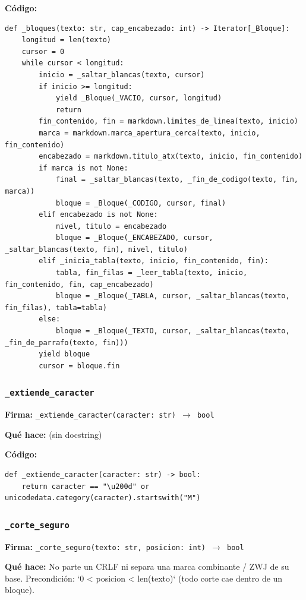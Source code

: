 \documentclass[11pt,a4paper]{article}
\begin{document}
\textbf{Código:}
\begin{lstlisting}
def _bloques(texto: str, cap_encabezado: int) -> Iterator[_Bloque]:
    longitud = len(texto)
    cursor = 0
    while cursor < longitud:
        inicio = _saltar_blancas(texto, cursor)
        if inicio >= longitud:
            yield _Bloque(_VACIO, cursor, longitud)
            return
        fin_contenido, fin = markdown.limites_de_linea(texto, inicio)
        marca = markdown.marca_apertura_cerca(texto, inicio, fin_contenido)
        encabezado = markdown.titulo_atx(texto, inicio, fin_contenido)
        if marca is not None:
            final = _saltar_blancas(texto, _fin_de_codigo(texto, fin, marca))
            bloque = _Bloque(_CODIGO, cursor, final)
        elif encabezado is not None:
            nivel, titulo = encabezado
            bloque = _Bloque(_ENCABEZADO, cursor, _saltar_blancas(texto, fin), nivel, titulo)
        elif _inicia_tabla(texto, inicio, fin_contenido, fin):
            tabla, fin_filas = _leer_tabla(texto, inicio, fin_contenido, fin, cap_encabezado)
            bloque = _Bloque(_TABLA, cursor, _saltar_blancas(texto, fin_filas), tabla=tabla)
        else:
            bloque = _Bloque(_TEXTO, cursor, _saltar_blancas(texto, _fin_de_parrafo(texto, fin)))
        yield bloque
        cursor = bloque.fin
\end{lstlisting}

\subsubsection*{\texttt{\_extiende\_caracter}}
\textbf{Firma:} \texttt{\_extiende\_caracter(caracter: str) $\rightarrow$ bool}

\textbf{Qué hace:} (sin docstring)

\textbf{Código:}
\begin{lstlisting}
def _extiende_caracter(caracter: str) -> bool:
    return caracter == "\u200d" or unicodedata.category(caracter).startswith("M")
\end{lstlisting}

\subsubsection*{\texttt{\_corte\_seguro}}
\textbf{Firma:} \texttt{\_corte\_seguro(texto: str, posicion: int) $\rightarrow$ bool}

\textbf{Qué hace:} No parte un CRLF ni separa una marca combinante / ZWJ de su base.
Precondición: `0 < posicion < len(texto)` (todo corte cae dentro de un bloque).
\end{document}
